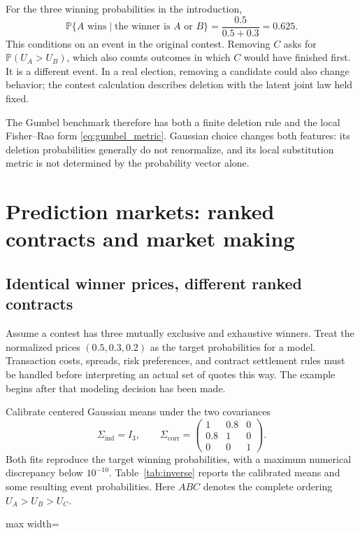 \documentclass[11pt]{amsart}
\newcommand{\Prob}{\mathbb P}
\theoremstyle{definition}
\begin{document}
For the three winning probabilities in the introduction,
\[
 \Prob\{A\text{ wins}\mid\text{the winner is }A\text{ or }B\}=\frac{0.5}{0.5+0.3}=0.625.
\]
This conditions on an event in the original contest. Removing $C$ asks for $\Prob(U_A>U_B)$, which also counts outcomes in which $C$ would have finished first. It is a different event. In a real election, removing a candidate could also change behavior; the contest calculation describes deletion with the latent joint law held fixed.

The Gumbel benchmark therefore has both a finite deletion rule and the local
Fisher--Rao form \eqref{eq:gumbel_metric}. Gaussian choice changes both
features: its deletion probabilities generally do not renormalize, and its
local substitution metric is not determined by the probability vector alone.

\section{Prediction markets: ranked contracts and market making}\label{sec:markets}

\subsection{Identical winner prices, different ranked contracts}
Assume a contest has three mutually exclusive and exhaustive winners. Treat the normalized prices $(0.5,0.3,0.2)$ as the target probabilities for a model. Transaction costs, spreads, risk preferences, and contract settlement rules must be handled before interpreting an actual set of quotes this way. The example begins after that modeling decision has been made.

Calibrate centered Gaussian means under the two covariances
\begin{equation}\label{eq:two_contests}
 \Sigma_{\mathrm{ind}}=I_3,\qquad
 \Sigma_{\mathrm{corr}}=
 \begin{pmatrix}1&0.8&0\\0.8&1&0\\0&0&1\end{pmatrix}.
\end{equation}
Both fits reproduce the target winning probabilities, with a maximum numerical discrepancy below $10^{-10}$. Table~\ref{tab:inverse} reports the calibrated means and some resulting event probabilities. Here $ABC$ denotes the complete ordering $U_A>U_B>U_C$.

\begin{table}[ht]
\centering
\caption{Two Gaussian inversions of the same winning probabilities $(0.5,0.3,0.2)$. The covariance is an input to each inversion.}\label{tab:inverse}
\begin{adjustbox}{max width=\textwidth}\end{adjustbox}
\end{table}
\end{document}
